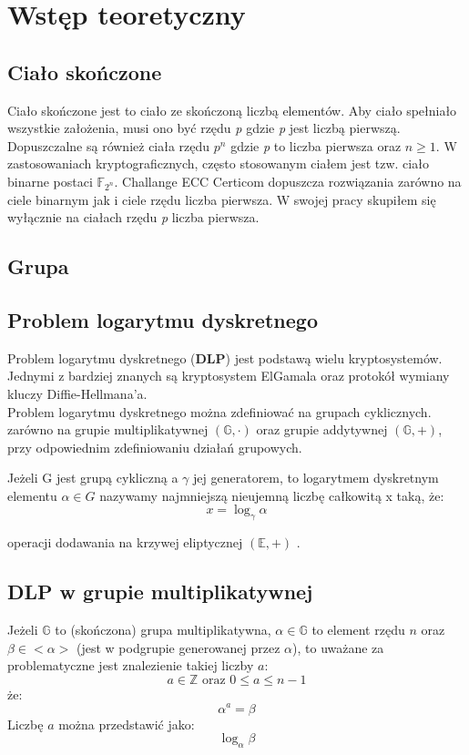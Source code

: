 \newpage %
\section{Wstęp teoretyczny}
\subsection{Ciało skończone}
Ciało skończone jest to ciało ze skończoną liczbą elementów.
Aby ciało spełniało wszystkie założenia, musi ono być rzędu
{\textit p} gdzie {\textit p} jest liczbą pierwszą. Dopuszczalne są również ciała
rzędu \(p^n\) gdzie {\textit p} to liczba pierwsza oraz \( n \geqslant 1\).
W zastosowaniach kryptograficznych, często stosowanym ciałem jest tzw. ciało binarne
postaci \(\mathbb{F}_{2^n}\).
Challange ECC Certicom dopuszcza rozwiązania zarówno na ciele binarnym jak
i ciele rzędu liczba pierwsza.
W swojej pracy skupiłem się wyłącznie na ciałach rzędu {\textit p} liczba pierwsza.

\subsection{Grupa}


\subsection{Problem logarytmu dyskretnego}
Problem logarytmu dyskretnego (\textbf{DLP}) jest
podstawą wielu kryptosystemów.
Jednymi z bardziej znanych są kryptosystem ElGamala oraz protokół wymiany
kluczy Diffie-Hellmana'a.
\\ Problem logarytmu dyskretnego można zdefiniować na grupach cyklicznych.
zarówno na grupie multiplikatywnej $(\mathbb{G},\cdot)$
oraz grupie addytywnej $(\mathbb{G}, +)$, przy odpowiednim zdefiniowaniu działań grupowych.

\begin{definition}
    Jeżeli G jest grupą cykliczną a $\gamma$ jej generatorem, to logarytmem dyskretnym
    elementu $\alpha \in G$ nazywamy najmniejszą nieujemną liczbę całkowitą x taką, że:
    \[x = \log_{\gamma}{\alpha}\]
\end{definition}
operacji dodawania na krzywej eliptycznej $(\mathbb{E},+)$ \cite{stinson21}.
% 
\subsection{DLP w grupie multiplikatywnej}
Jeżeli $\mathbb{G}$ to (skończona) grupa multiplikatywna, $\alpha \in \mathbb{G}$
to element rzędu $n$ oraz $\beta \in \mathbb{<\alpha>}$ (jest w podgrupie generowanej
przez $\alpha$), to uważane za problematyczne jest znalezienie takiej liczby $a$:
\[a \in \mathbb{Z} \textrm{ oraz } 0\le a \le n-1\]
że:
\[\alpha ^ a = \beta\]
% 
Liczbę $a$ można przedstawić jako:
\[\log_{\alpha}{\beta}\]
% 
% 
